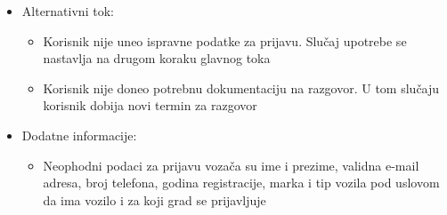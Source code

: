 \begin{itemize}
	\item Alternativni tok:
		\begin{itemize}
    			\item Korisnik nije uneo ispravne podatke za prijavu. Slučaj upotrebe se nastavlja na drugom koraku glavnog toka
		    \item Korisnik nije doneo potrebnu dokumentaciju na razgovor. U tom slučaju korisnik dobija novi termin za razgovor
		\end{itemize}


	\item Dodatne informacije:
		\begin{itemize}
			\item Neophodni podaci za prijavu vozača su ime i prezime, validna e-mail adresa, broj telefona, godina registracije, marka i tip vozila pod uslovom da ima vozilo i za koji grad se prijavljuje
		\end{itemize}						


\end{itemize}


